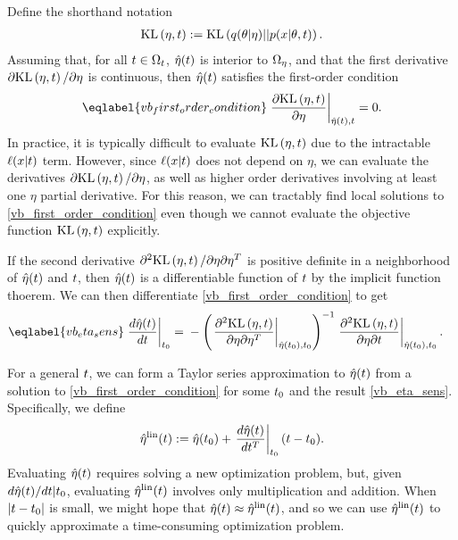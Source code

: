 Define the shorthand notation
%
\begin{align*}
%
\KL{\eta, \t} := \KL{\q(\theta \vert \eta) || p(\x \vert \theta, \t)}.
%
\end{align*}
%
Assuming that, for all $t \in \Omega_{t}$, $\hat\eta(t)$ is interior to $\Omega_{\eta}$,
and that the first derivative $\partial \mathrm{KL}\left(\eta, t\right)/ \partial \eta$ is
continuous, then $\hat\eta(t)$ satisfies the first-order condition
%
\begin{align}\eqlabel{vb_first_order_condition}
%
\fracat{\partial \KL{\eta, \t}}{ \partial \eta}{\etaopt(\t), \t} = 0.
%
\end{align}
%
In practice, it is typically difficult to evaluate $\mathrm{KL}\left(\eta, t\right)$ due to the
intractable $\ell(x \vert t)$ term.  However, since $\ell(x \vert t)$ does
not depend on $\eta$, we can evaluate the derivatives $\partial \mathrm{KL}\left(\eta, t\right) /
\partial \eta$, as well as higher order derivatives involving at least one
$\eta$ partial derivative.  For this reason, we can tractably find local
solutions to \eqref{vb_first_order_condition} even though we cannot evaluate the
objective function $\mathrm{KL}\left(\eta, t\right)$ explicitly.

If the second derivative $\partial^2 \mathrm{KL}\left(\eta, t\right)/ \partial \eta \partial
\eta^T$ is positive definite in a neighborhood of $\hat\eta(t)$ and $t$, then
$\hat\eta(t)$ is a differentiable function of $t$ by the implicit function
thoerem.  We can then differentiate \eqref{vb_first_order_condition} to get
%
\begin{align}\eqlabel{vb_eta_sens}
%
\fracat{d \etaopt(\t)}{d \t}{\t_0} ={}&
    - \left( \fracat{\partial^2 \KL{\eta, \t}}
                    {\partial \eta \partial \eta^T}
                    {\etaopt(\t_0), \t_0} \right)^{-1}
    \fracat{\partial^2 \KL{\eta, \t}}
           {\partial \eta \partial \t}
           {\etaopt(\t_0), \t_0}.
%
\end{align}

For a general $t$, we can form a Taylor series approximation to $\hat\eta(t)$
from a solution to \eqref{vb_first_order_condition} for some $t_0$ and the
result \eqref{vb_eta_sens}.  Specifically, we define
%
\begin{align*}
%
\etalin(\t) := \etaopt(\t_0) + \fracat{d \etaopt(\t)}{d \t^T}{\t_0} (\t - \t_0).
%
\end{align*}
%
Evaluating $\hat\eta(t)$ requires solving a new optimization problem, but, given
$d\hat\eta(t) / dt | t_0$, evaluating $\hat\eta^{\mathrm{lin}}(t)$ involves only
multiplication and addition.  When $|t - t_0|$ is small, we might hope
that $\hat\eta(t) \approx \hat\eta^{\mathrm{lin}}(t)$, and so we can use $\hat\eta^{\mathrm{lin}}(t)$
to quickly approximate a time-consuming optimization problem.


